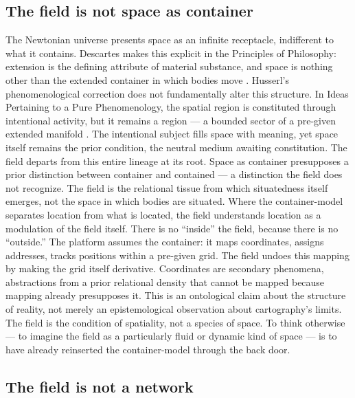 \subsection{The field is not space as container}

The Newtonian universe presents space as an infinite receptacle, indifferent to what it contains. Descartes makes this explicit in the Principles of Philosophy: extension is the defining attribute of material substance, and space is nothing other than the extended container in which bodies move \cite{descartes_1644}. Husserl’s phenomenological correction does not fundamentally alter this structure. In Ideas Pertaining to a Pure Phenomenology, the spatial region is constituted through intentional activity, but it remains a region — a bounded sector of a pre-given extended manifold \cite{husserl_1913}. The intentional subject fills space with meaning, yet space itself remains the prior condition, the neutral medium awaiting constitution. The field departs from this entire lineage at its root. Space as container presupposes a prior distinction between container and contained — a distinction the field does not recognize. The field is the relational tissue from which situatedness itself emerges, not the space in which bodies are situated. Where the container-model separates location from what is located, the field understands location as a modulation of the field itself. There is no “inside” the field, because there is no “outside.” The platform assumes the container: it maps coordinates, assigns addresses, tracks positions within a pre-given grid. The field undoes this mapping by making the grid itself derivative. Coordinates are secondary phenomena, abstractions from a prior relational density that cannot be mapped because mapping already presupposes it. This is an ontological claim about the structure of reality, not merely an epistemological observation about cartography’s limits. The field is the condition of spatiality, not a species of space. To think otherwise — to imagine the field as a particularly fluid or dynamic kind of space — is to have already reinserted the container-model through the back door.

\subsection{The field is not a network}

